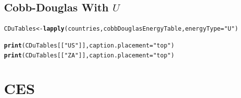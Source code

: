 \documentclass[preprint,authoryear,12pt]{elsarticle}\usepackage{graphicx, color}
\makeatletter
\newcommand{\hlfunctioncall}[1]{\textcolor[rgb]{0.501960784313725,0,0.329411764705882}{\textbf{#1}}}%
\newcommand{\hlstring}[1]{\textcolor[rgb]{0.6,0.6,1}{#1}}%
\newenvironment{kframe}{%
 \def\at@end@of@kframe{}%
 \ifinner\ifhmode%
  \def\at@end@of@kframe{\end{minipage}}%
  \begin{minipage}{\columnwidth}%
 \fi\fi%
 \def\FrameCommand##1{\hskip\@totalleftmargin \hskip-\fboxsep
 \colorbox{shadecolor}{##1}\hskip-\fboxsep
     \hskip-\linewidth \hskip-\@totalleftmargin \hskip\columnwidth}%
 \MakeFramed {\advance\hsize-\width
   \@totalleftmargin\z@ \linewidth\hsize
   \@setminipage}}%
 {\par\unskip\endMakeFramed%
 \at@end@of@kframe}
\newenvironment{knitrout}{}{} %
\makeatother
\begin{document}
\subsection{Cobb-Douglas With $U$}

\begin{knitrout}
\color{fgcolor}\begin{kframe}
\begin{alltt}
CDuTables <- \hlfunctioncall{lapply}(countries, cobbDouglasEnergyTable, energyType=\hlstring{"U"})
\end{alltt}
\end{kframe}
\end{knitrout}


\begin{kframe}
\begin{alltt}
\hlfunctioncall{print}(CDuTables[[\hlstring{"US"}]], caption.placement=\hlstring{"top"})
\hlfunctioncall{print}(CDuTables[[\hlstring{"ZA"}]], caption.placement=\hlstring{"top"})
\end{alltt}
\end{kframe}


\section{CES}
\end{document}
